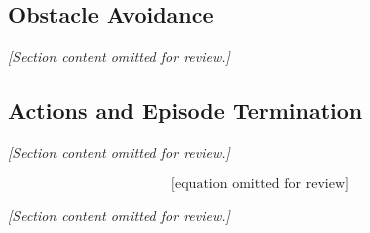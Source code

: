 \subsection{Obstacle Avoidance}
\textit{[Section content omitted for review.]}

\subsection{Actions and Episode Termination}
\textit{[Section content omitted for review.]}

\begin{equation}
\text{[equation omitted for review]}
\label{eq:action_space}
\end{equation}

\textit{[Section content omitted for review.]}
